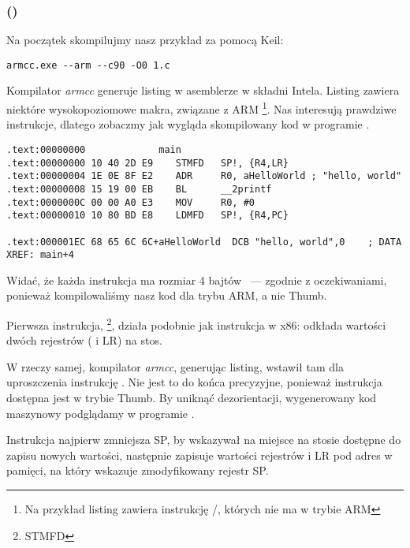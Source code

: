 \subsubsection{\NonOptimizingKeilVI (\ARMMode)}

Na początek skompilujmy nasz przykład za pomocą Keil:

\begin{lstlisting}
armcc.exe --arm --c90 -O0 1.c 
\end{lstlisting}

\myindex{\IntelSyntax}
Kompilator \emph{armcc} generuje listing w asemblerze w składni Intela.
Listing zawiera niektóre wysokopoziomowe makra, związane z ARM
\footnote{Na przykład listing zawiera instrukcję \PUSH/\POP, których nie ma w trybie ARM}.
Nas interesują prawdziwe instrukcje, dlatego zobaczmy jak wygląda skompilowany kod w programie \IDA.

\begin{lstlisting}[caption=\NonOptimizingKeilVI (\ARMMode) \IDA,style=customasmARM]
.text:00000000             main
.text:00000000 10 40 2D E9    STMFD   SP!, {R4,LR}
.text:00000004 1E 0E 8F E2    ADR     R0, aHelloWorld ; "hello, world"
.text:00000008 15 19 00 EB    BL      __2printf
.text:0000000C 00 00 A0 E3    MOV     R0, #0
.text:00000010 10 80 BD E8    LDMFD   SP!, {R4,PC}

.text:000001EC 68 65 6C 6C+aHelloWorld  DCB "hello, world",0    ; DATA XREF: main+4
\end{lstlisting}

Widać, że każda instrukcja ma rozmiar 4 bajtów ~--- zgodnie z oczekiwaniami, ponieważ kompilowaliśmy nasz kod dla trybu ARM, a nie Thumb.

Pierwsza instrukcja, \footnote{\ac{STMFD}},
działa podobnie jak instrukcja \PUSH w x86: odkłada wartości dwóch rejestrów ( i \ac{LR}) na stos.

W rzeczy samej, kompilator \emph{armcc}, generując listing, wstawił tam dla uproszczenia instrukcję .
Nie jest to do końca precyzyjne, ponieważ instrukcja \PUSH dostępna jest w trybie Thumb.
By uniknąć dezorientacji, wygenerowany kod maszynowy podglądamy w programie \IDA.

Instrukcja najpierw zmniejsza \ac{SP}, by wskazywał na miejsce na stosie dostępne do zapisu nowych wartości, następnie zapisuje wartości rejestrów  i \ac{LR}
pod adres w pamięci, na który wskazuje zmodyfikowany rejestr \ac{SP}.

